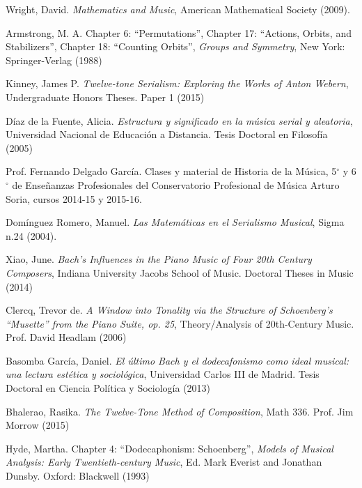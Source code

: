 	\begin{thebibliography}{00}

			{\sc Wright, David.} 
			\textit{Mathematics and Music},
			American Mathematical Society 
			(2009).
			
			{\sc Armstrong, M. A.} Chapter 6: “Permutations”, Chapter 17: “Actions, Orbits, and Stabilizers”, Chapter 18: “Counting Orbits”,
			\textit{Groups and Symmetry},
			New York: Springer-Verlag
			(1988)

			{\sc Kinney, James P.} 
			\textit{Twelve-tone Serialism: Exploring the Works of Anton Webern},
			Undergraduate Honors Theses.
			Paper 1
			(2015)
			
			{\sc Díaz de la Fuente, Alicia.} 
			\textit{Estructura y significado en la música serial y aleatoria},
			Universidad Nacional de Educación a Distancia.
			Tesis Doctoral en Filosofía
			(2005)
			
			{\sc Prof. Fernando Delgado García.} 
			Clases y material de Historia de la Música, 5$^{\circ}$ y 6$^{\circ}$ de Enseñanzas Profesionales del Conservatorio Profesional de Música Arturo Soria, cursos 2014-15 y 2015-16.
			
			{\sc Domínguez Romero, Manuel.} 
			\textit{Las Matemáticas en el Serialismo Musical},
			Sigma n.24 
			(2004).
					
			{\sc Xiao, June.} 
			\textit{Bach’s Influences in the Piano Music of Four 20th Century Composers},
			Indiana University Jacobs School of Music.
			Doctoral Theses in Music
			(2014)
			
			{\sc Clercq, Trevor de.} 
			\textit{A Window into Tonality via the Structure of Schoenberg's ``Musette'' from the Piano Suite, op. 25},
			Theory/Analysis of 20th-Century Music.
			Prof. David Headlam
			(2006)
			
			{\sc Basomba García, Daniel.} 
			\textit{El último Bach y el dodecafonismo como ideal musical: una lectura estética y sociológica},
			Universidad Carlos III de Madrid.
			Tesis Doctoral en Ciencia Política y Sociología
			(2013)
			
			{\sc Bhalerao, Rasika.} 
			\textit{The Twelve-Tone Method of Composition},
			Math 336.
			Prof. Jim Morrow
			(2015)
			
			{\sc Hyde, Martha.} Chapter 4: “Dodecaphonism: Schoenberg”,
			\textit{Models of Musical Analysis: Early Twentieth-century Music},
			Ed. Mark Everist and Jonathan Dunsby.
			Oxford: Blackwell
			(1993)
			

\end{thebibliography}
